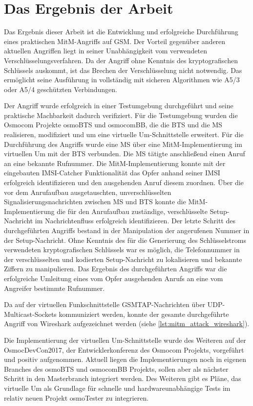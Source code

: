 \chapter{Das Ergebnis der Arbeit} \label{hdl:ergebnis}

Das Ergebnis dieser Arbeit ist die Entwicklung und erfolgreiche Durchführung eines praktischen \ac{MitM}-Angriffs auf \ac{GSM}. Der Vorteil gegenüber anderen aktuellen Angriffen liegt in seiner Unabhängigkeit vom verwendeten Verschlüsselungsverfahren. Da der Angriff ohne Kenntnis des kryptografischen Schlüssels auskommt, ist das Brechen der Verschlüsselung nicht notwendig. Das ermöglicht seine Ausführung in vollständig mit sicheren Algorithmen wie A5/3 oder A5/4 geschützten Verbindungen.

Der Angriff wurde erfolgreich in einer Testumgebung durchgeführt und seine praktische Machbarkeit dadurch verifiziert. Für die Testumgebung wurden die Osmocom Projekte osmoBTS und osmocomBB, die die \ac{BTS} und die \ac{MS} realisieren, modifiziert und um eine virtuelle \ac{Um}-Schnittstelle erweitert. Für die Durchführung des Angriffs wurde eine \ac{MS} über eine \ac{MitM}-Implementierung  im virtuellen \ac{Um} mit der \ac{BTS} verbunden. Die \ac{MS} tätigte anschließend einen Anruf an eine bekannte Rufnummer. Die \ac{MitM}-Implementierung konnte mit der eingebauten \ac{IMSI}-Catcher Funktionalität das Opfer anhand seiner \ac{IMSI} erfolgreich identifizieren und den ausgehenden Anruf diesem zuordnen. Über die vor dem Anrufaufbau ausgetauschten, unverschlüsselten Signalisierungsnachrichten zwischen \ac{MS} und \ac{BTS} konnte die \ac{MitM}-Implementierung die für den Anrufaufbau zuständige, verschlüsselte Setup-Nachricht im Nachrichtenfluss erfolgreich identifizieren. Der letzte Schritt des durchgeführten Angriffs bestand in der Manipulation der angerufenen Nummer in der Setup-Nachricht. Ohne Kenntnis des für die Generierung des Schlüsselstroms verwendeten kryptografischen Schlüssels war es möglich, die Telefonnummer in der verschlüsselten und kodierten Setup-Nachricht zu lokalisieren und bekannte Ziffern zu manipulieren. Das Ergebnis des durchgeführten Angriffs war die erfolgreiche Umleitung eines vom Opfer ausgehenden Anrufs an eine vom Angreifer bestimmte Rufnummer.

Da auf der virtuellen Funkschnittstelle \ac{GSMTAP}-Nachrichten über \ac{UDP}-Multicast-Sockets kommuniziert werden, konnte der gesamte durchgeführte Angriff von Wireshark aufgezeichnet werden (siehe \autoref{lst:mitm_attack_wireshark}).

Die Implementierung der virtuellen \ac{Um}-Schnittstelle wurde des Weiteren auf der OsmocDevCon2017, der Entwicklerkonferenz des Osmocom Projekts, vorgeführt und positiv aufgenommen. Aktuell liegen die Implementierungen noch in eigenen Branches des osmoBTS und osmocomBB Projekts, sollen aber als nächster Schritt in den Masterbranch integriert werden. Des Weiteren gibt es Pläne, das virtuelle \ac{Um} als Grundlage für schnelle und hardwareunabhängige Tests im relativ neuen Projekt osmoTester zu integrieren. 
